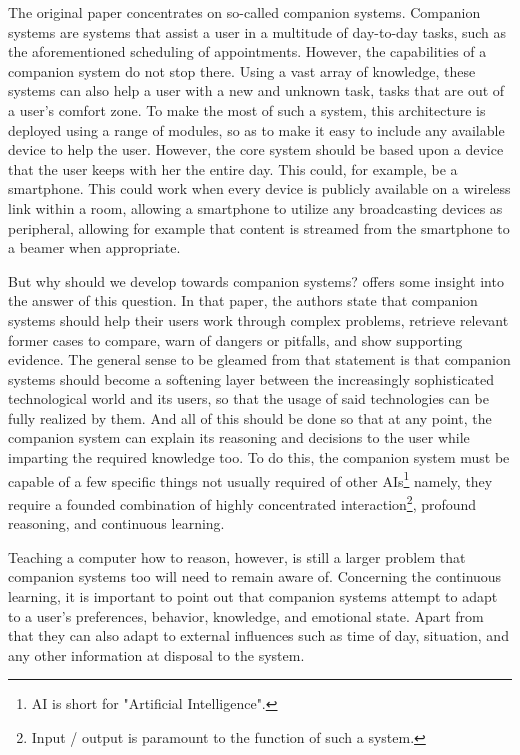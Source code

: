 \documentclass[a4paper]{article}
\begin{document}
The original paper concentrates on so-called companion systems. Companion systems are systems that assist a user in a multitude of day-to-day tasks, such as the aforementioned scheduling of appointments. However, the capabilities of a companion system do not stop there. Using a vast array of knowledge, these systems can also help a user with a new and unknown task, tasks that are out of a user's comfort zone. To make the most of such a system, this architecture is deployed using a range of modules, so as to make it easy to include any available device to help the user. However, the core system should be based upon a device that the user keeps with her the entire day. This could, for example, be a smartphone. This could work when every device is publicly available on a wireless link within a room, allowing a smartphone to utilize any broadcasting devices as peripheral, allowing for example that content is streamed from the smartphone to a beamer when appropriate.

But why should we develop towards companion systems? \cite{forbus2006companion} offers some insight into the answer of this question. In that paper, the authors state that companion systems should help their users work through complex problems, retrieve relevant former cases to compare, warn of dangers or pitfalls, and show supporting evidence. The general sense to be gleamed from that statement is that companion systems should become a softening layer between the increasingly sophisticated technological world and its users, so that the usage of said technologies can be fully realized by them. And all of this should be done so that at any point, the companion system can explain its reasoning and decisions to the user while imparting the required knowledge too. To do this, the companion system must be capable of a few specific things not usually required of other AIs\footnote{AI is short for "Artificial Intelligence".} namely, they require a founded combination of highly concentrated interaction\footnote{Input / output is paramount to the function of such a system.}, profound reasoning, and continuous learning.

Teaching a computer how to reason, however, is still a larger problem that companion systems too will need to remain aware of. Concerning the continuous learning, it is important to point out that companion systems attempt to adapt to a user's preferences, behavior, knowledge, and emotional state. Apart from that they can also adapt to external influences such as time of day, situation, and any other information at disposal to the system.
\end{document}
